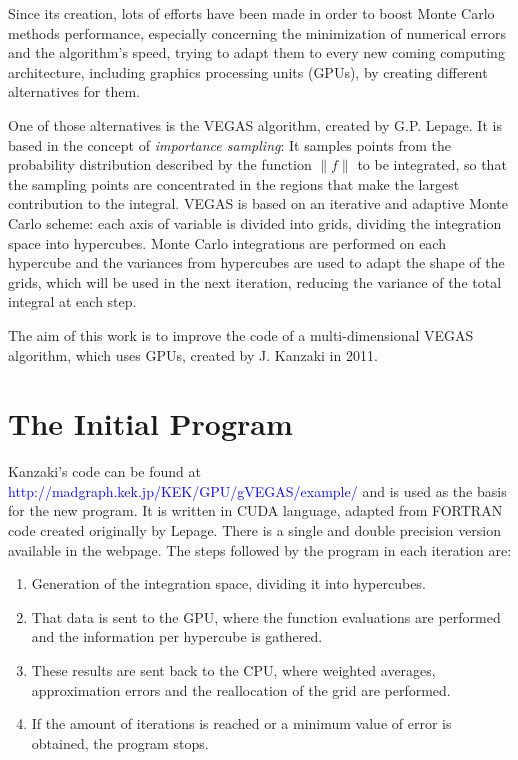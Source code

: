 \documentclass[english]{maciarticle}
\begin{document}
Since its creation, lots of efforts have been made in order to boost Monte Carlo methods performance, especially concerning the minimization of numerical errors and the algorithm's speed, trying to adapt them to every new coming computing architecture, including graphics processing units (GPUs), by creating different alternatives for them\cite{montesurvey}.

One of those alternatives is the VEGAS algorithm, created by G.P. Lepage\cite{vegas}. It is based in the concept of \textit{importance sampling}: It samples points from the probability distribution described by the function $\|f\|$ to be integrated, so that the sampling points are concentrated in the regions that make the largest contribution to the integral. VEGAS is based on an iterative and adaptive Monte Carlo scheme: each axis of variable is divided into grids, dividing the integration space into hypercubes. Monte Carlo integrations are performed on each hypercube and the variances from hypercubes are used to adapt the shape of the grids, which will be used in the next iteration, reducing the variance of the total integral at each step.

The aim of this work is to improve the code of a multi-dimensional VEGAS algorithm, which uses GPUs, created by J. Kanzaki in 2011\cite{kanzaki}.

\section{The Initial Program} 
Kanzaki's code can be found at \textcolor{blue}{http://madgraph.kek.jp/KEK/GPU/gVEGAS/example/} and is used as the basis for the new program. It is written in CUDA language, adapted from FORTRAN code created originally by Lepage\cite{lepagecode}. There is a single and double precision version available in the webpage. The steps followed by the program in each iteration are:

\begin{enumerate}
	\item Generation of the integration space, dividing it into hypercubes.
	\item \vspace{-0.3cm} That data is sent to the GPU, where the function evaluations are performed and the information per hypercube is gathered.
	\item \vspace{-0.3cm} These results are sent back to the CPU, where weighted averages, approximation errors and the reallocation of the grid are performed.
	\item \vspace{-0.6cm} If the amount of iterations is reached or a minimum value of error is obtained, the program stops.
\end{enumerate} 
\end{document}
